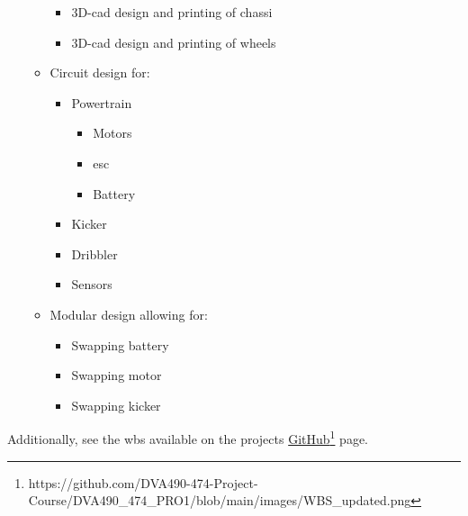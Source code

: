 \begin{itemize}
\begin{itemize}
        \begin{itemize}
            \item 3D-\acs{cad} design and printing of chassi
            \item 3D-\acs{cad} design and printing of wheels
        \end{itemize}
        \item Circuit design for:
        \begin{itemize}
            \item Powertrain
            \begin{itemize}
                \item Motors
                \item \ac{esc}
                \item Battery
            \end{itemize}
            \item Kicker
            \item Dribbler
            \item Sensors
        \end{itemize}
        \item Modular design allowing for:
        \begin{itemize}
            \item Swapping battery
            \item Swapping motor
            \item Swapping kicker
        \end{itemize}
    \end{itemize}
\end{itemize}   
Additionally, see the \ac{wbs} available on the projects \href{https://github.com/DVA490-474-Project-Course/DVA490_474_PRO1/blob/main/images/WBS_updated.png}{GitHub}\footnote{https://github.com/DVA490-474-Project-Course/DVA490\_474\_PRO1/blob/main/images/WBS\_updated.png} page.



